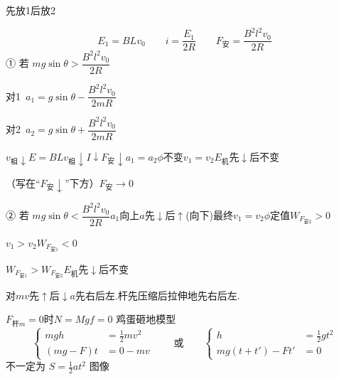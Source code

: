 \begin{problem}
先放1后放2
\begin{solution}
\[ E_1=BLv_0\qquad i=\frac{E_1}{2R}\qquad F_{\text{安}}=\frac{B^2l^2v_0}{2R} \]
① 若 $mg\sin\theta>\dfrac{B^2l^2v_0}{2R}$

\quad 对1\ $a_1=g\sin\theta-\dfrac{B^2l^2v_0}{2mR}$

\quad 对2\ $a_2=g\sin\theta+\dfrac{B^2l^2v_0}{2mR}$

$v_{\text{相}}\downarrow$\quad $E=BLv_{\text{相}}\downarrow$\quad $I\downarrow$\quad $F_{\text{安}}\downarrow$\quad $a_1=a_2$\quad $\phi$不变\quad $v_1=v_2$\quad $E_{\text{机}}$先$\downarrow$后不变

（写在“$F_{\text{安}}\downarrow$”下方）$F_{\text{安}}\to0$

② 若 $mg\sin\theta<\dfrac{B^2l^2v_0}{2R}$\quad $a_1$向上\quad $a$先$\downarrow$后$\uparrow$(向下)\quad 最终$v_1=v_2$\quad $\phi$定值\quad $W_{F_{\text{安}2}}>0$

$v_1>v_2$\quad $W_{F_{\text{安}1}}<0$ %

$W_{F_{\text{安}1}}>W_{F_{\text{安}2}}$\quad $E_{\text{机}}$先$\downarrow$后不变 %
\end{solution}
\end{problem}
对$m$\quad $v$先$\uparrow$后$\downarrow$\quad $a$先右后左.\quad 杆先压缩后拉伸\quad 地先右后左.

$F_{\text{杆}m}=0$时\quad $N=Mg$\quad $f=0$
鸡蛋砸地模型
\[ \left\{\begin{aligned} mgh&=\tfrac12mv^2\\ (mg-F)t&=0-mv \end{aligned}\right. \qquad\text{或}\qquad \left\{\begin{aligned} h&=\tfrac12gt^2\\ mg(t+t')-Ft'&=0 \end{aligned}\right. \]
不一定为 $S=\tfrac12at^2$ 图像

